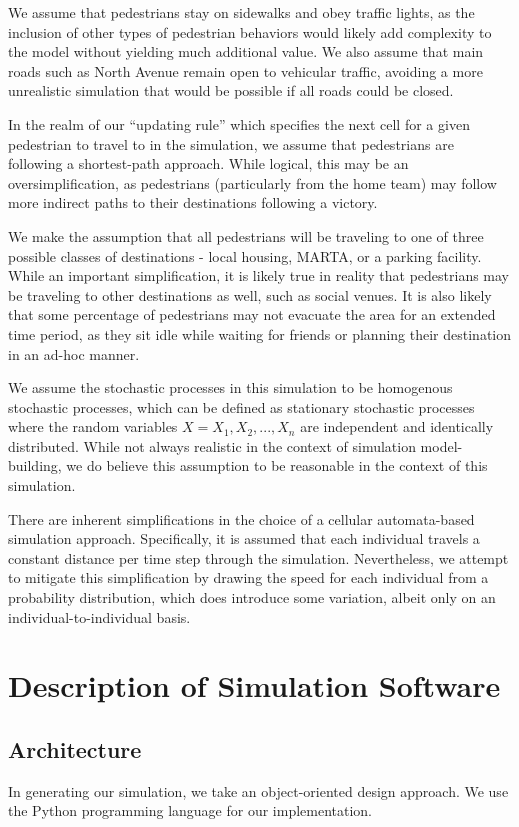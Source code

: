 \documentclass[12pt]{article}
\begin{document}
We assume that pedestrians stay on sidewalks and obey traffic lights, as the
inclusion of other types of pedestrian behaviors would likely add complexity
to the model without yielding much additional value. We also assume that main
roads such as North Avenue remain open to vehicular traffic, avoiding a more
unrealistic simulation that would be possible if all roads could be closed.

In the realm of our ``updating rule'' which specifies the next cell for a given
pedestrian to travel to in the simulation, we assume that pedestrians are
following a shortest-path approach. While logical, this may be an
oversimplification, as pedestrians (particularly from the home team) may follow
more indirect paths to their destinations following a victory.

We make the assumption that all pedestrians will be traveling to one of three
possible classes of destinations - local housing, MARTA, or a parking facility.
While an important simplification, it is likely true in reality that pedestrians
may be traveling to other destinations as well, such as social venues. It is
also likely that some percentage of pedestrians may not evacuate the area for
an extended time period, as they sit idle while waiting for friends or planning
their destination in an ad-hoc manner.

We assume the stochastic processes in this simulation to be homogenous
stochastic processes, which can be defined as stationary stochastic processes
where the random variables $X = X_1, X_2, ..., X_n$ are independent and
identically distributed. While not always realistic in the context of
simulation model-building, we do believe this assumption to be reasonable in
the context of this simulation.

There are inherent simplifications in the choice of a cellular automata-based
simulation approach. Specifically, it is assumed that each individual travels
a constant distance per time step through the simulation. Nevertheless, we
attempt to mitigate this simplification by drawing the speed for each
individual from a probability distribution, which does introduce some
variation, albeit only on an individual-to-individual basis.

\section{Description of Simulation Software}

\subsection{Architecture}
In generating our simulation, we take an object-oriented design approach. We use
the Python programming language for our implementation.
\end{document}
